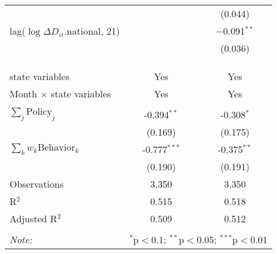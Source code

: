 \begin{tabular}{@{\extracolsep{1pt}}lcc}
  &  & (0.044) \\ 
  lag($\log \Delta D_{it}$.national, 21) &  & $-$0.091$^{**}$ \\ 
  &  & (0.036) \\ 
   &  &  \\ 
  &  &  \\ 
 \hline \\[-1.8ex] 
state variables & Yes & Yes \\ 
Month $\times$ state variables & Yes & Yes \\ 
\hline \\[-1.8ex] 
$\sum_j \mathrm{Policy}_j$ & -0.394$^{**}$ & -0.308$^{*}$ \\ 
 & (0.169) & (0.175) \\ 
$\sum_k w_k \mathrm{Behavior}_k$ & -0.777$^{***}$ & -0.375$^{**}$ \\ 
 & (0.190) & (0.191) \\ 
Observations & 3,350 & 3,350 \\ 
R$^{2}$ & 0.515 & 0.518 \\ 
Adjusted R$^{2}$ & 0.509 & 0.512 \\ 
\hline 
\hline \\[-1.8ex] 
\textit{Note:}  & \multicolumn{2}{r}{$^{*}$p$<$0.1; $^{**}$p$<$0.05; $^{***}$p$<$0.01} \\ 
\end{tabular} 